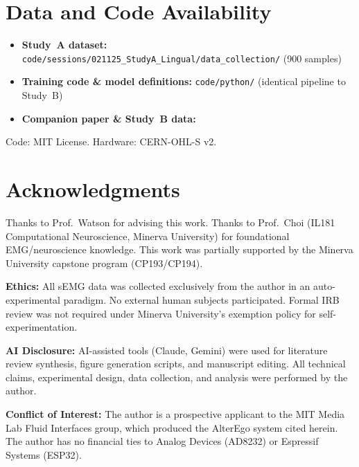 \documentclass[11pt, a4paper]{article}
\begin{document}
\section*{Data and Code Availability}

\begin{itemize}
    \item \textbf{Study~A dataset:} \texttt{code/sessions/021125\_StudyA\_Lingual/data\_collection/} (900 samples)
    \item \textbf{Training code \& model definitions:} \texttt{code/python/} (identical pipeline to Study~B)
    \item \textbf{Companion paper \& Study~B data:}~\cite{kho2026companion}
\end{itemize}
Code: MIT License. Hardware: CERN-OHL-S v2.

\section*{Acknowledgments}

Thanks to Prof.\ Watson for advising this work. Thanks to Prof.\ Choi (IL181 Computational Neuroscience, Minerva University) for foundational EMG/neuroscience knowledge. This work was partially supported by the Minerva University capstone program (CP193/CP194).

\textbf{Ethics:} All sEMG data was collected exclusively from the author in an auto-experimental paradigm. No external human subjects participated. Formal IRB review was not required under Minerva University's exemption policy for self-experimentation.

\textbf{AI Disclosure:} AI-assisted tools (Claude, Gemini) were used for literature review synthesis, figure generation scripts, and manuscript editing. All technical claims, experimental design, data collection, and analysis were performed by the author.

\textbf{Conflict of Interest:} The author is a prospective applicant to the MIT Media Lab Fluid Interfaces group, which produced the AlterEgo system cited herein. The author has no financial ties to Analog Devices (AD8232) or Espressif Systems (ESP32).
\end{document}
